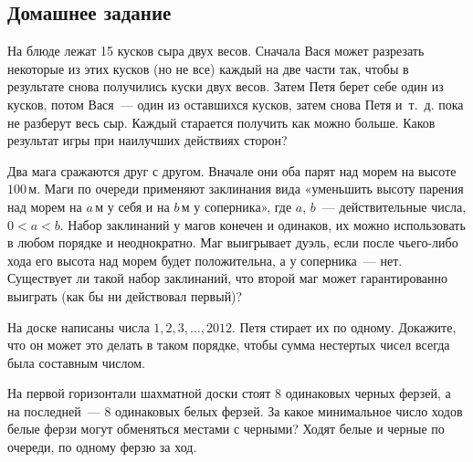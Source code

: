 

\subsection*{Домашнее задание}



\begin{problems}

\item
На блюде лежат 15 кусков сыра двух весов.
Сначала Вася может разрезать некоторые из этих кусков (но не все) каждый на две
части так, чтобы в результате снова получились куски двух весов.
Затем Петя берет себе один из кусков, потом Вася~— один из оставшихся кусков,
затем снова Петя и~т.~д. пока не разберут весь сыр.
Каждый старается получить как можно больше.
Каков результат игры при наилучших действиях сторон?


\item
Два мага сражаются друг с другом.
Вначале они оба парят над морем на высоте $100\,\text{м}$.
Маги по очереди применяют заклинания вида «уменьшить высоту парения над морем
на $a\,\text{м}$ у себя и на $b\,\text{м}$ у соперника», где $a$, $b$~—
действительные числа, $0 < a < b$.
Набор заклинаний у магов конечен и одинаков, их можно использовать в любом
порядке и неоднократно.
Маг выигрывает дуэль, если после чьего-либо хода его высота над морем будет
положительна, а у соперника~— нет.
Существует ли такой набор заклинаний, что второй маг может гарантированно
выиграть (как бы ни действовал первый)?

\item
На доске написаны числа $1, 2, 3, \ldots, 2012$.
Петя стирает их по одному.
Докажите, что он может это делать в таком порядке, чтобы сумма нестертых чисел
всегда была составным числом.

\item
На первой горизонтали шахматной доски стоят 8 одинаковых черных ферзей,
а на последней~— 8 одинаковых белых ферзей.
За какое минимальное число ходов белые ферзи могут обменяться местами
с черными?
Ходят белые и черные по очереди, по одному ферзю за ход.


\end{problems}
